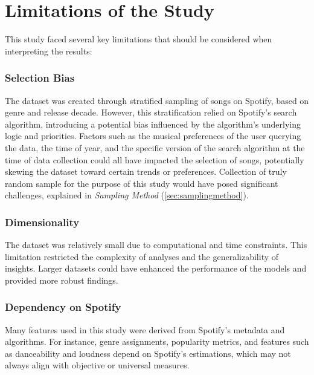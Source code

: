 \section{Limitations of the Study}
\label{sec:limitations}

This study faced several key limitations that should be considered when
interpreting the results:

\subsubsection*{Selection Bias}

The dataset was created through stratified sampling of songs on Spotify, based
on genre and release decade. However, this stratification relied on Spotify's
search algorithm, introducing a potential bias influenced by the algorithm's
underlying logic and priorities. Factors such as the musical preferences of the
user querying the data, the time of year, and the specific version of the
search algorithm at the time of data collection could all have impacted the
selection of songs, potentially skewing the dataset toward certain trends or
preferences. Collection of truly random sample for the purpose of this study
would have posed significant challenges, explained in \textit{Sampling
Method} (\ref{sec:samplingmethod}).




\subsubsection*{Dimensionality}

The dataset was relatively small due to computational and time constraints.
This limitation restricted the complexity of analyses and the generalizability
of insights. Larger datasets could have enhanced the performance of the models
and provided more robust findings.

\subsubsection*{Dependency on Spotify}
Many features used in this study were derived from Spotify's metadata and
algorithms. For instance, genre assignments, popularity metrics, and features
such as danceability and loudness depend on Spotify's estimations, which may
not always align with objective or universal measures.



